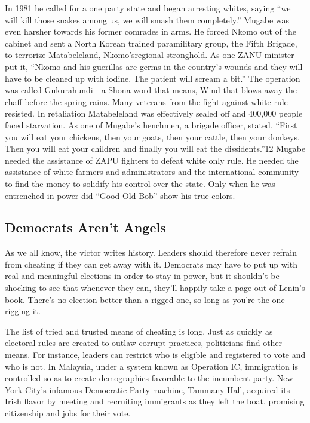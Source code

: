 \documentclass[10pt]{article}
\begin{document}
{\large In 1981 he called for a one party state and began arresting whites,
saying ``we will kill those snakes among us, we will smash them completely.''
Mugabe was even harsher towards his former comrades in arms. He forced Nkomo out
of the cabinet and sent a North Korean trained paramilitary group, the Fifth
Brigade, to terrorize Matabeleland, Nkomo'sregional stronghold. As one ZANU
minister put it, ``Nkomo and his guerillas are germs in the country's wounds and
they will have to be cleaned up with iodine. The patient will scream a bit.'' The
operation was called Gukurahundi---a Shona word that means, Wind that blows away
the chaff before the spring rains. Many veterans from the fight against white
rule resisted. In retaliation Matabeleland was effectively sealed off and 400,000
people faced starvation. As one of Mugabe's henchmen, a brigade officer, stated,
``First you will eat your chickens, then your goats, then your cattle, then your
donkeys. Then you will eat your children and finally you will eat the
dissidents.''12 Mugabe needed the assistance of ZAPU fighters to defeat white
only rule. He needed the assistance of white farmers and administrators and the
international community to find the money to solidify his control over the state.
Only when he was entrenched in power did ``Good Old Bob'' show his true colors.}

\subsection{Democrats Aren't Angels}

{\large  As we all know, the victor writes history. Leaders should therefore
never refrain from cheating if they can get away with it. Democrats may have to
put up with real and meaningful elections in order to stay in power, but it
shouldn't be shocking to see that whenever they can, they'll happily take a page
out of Lenin's book. There's no election better than a rigged one, so long as
you're the one rigging it.}

{\large The list of tried and trusted means of cheating is long. Just as quickly
as electoral rules are created to outlaw corrupt practices, politicians find
other means. For instance, leaders can restrict who is eligible and registered to
vote and who is not. In Malaysia, under a system known as Operation IC,
immigration is controlled so as to create demographics favorable to the incumbent
party. New York City's infamous Democratic Party machine, Tammany Hall, acquired
its Irish flavor by meeting and recruiting immigrants as they left the boat,
promising citizenship and jobs for their vote.}
\end{document}
